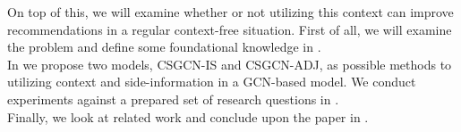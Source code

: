 On top of this, we will examine whether or not utilizing this context can improve recommendations in a regular context-free situation.
First of all, we will examine the problem and define some foundational knowledge in .\\
In  we propose two models, CSGCN-IS and CSGCN-ADJ, as possible methods to utilizing context and side-information in a GCN-based model.
We conduct experiments against a prepared set of research questions in .\\
Finally, we look at related work and conclude upon the paper in .
\\\\
